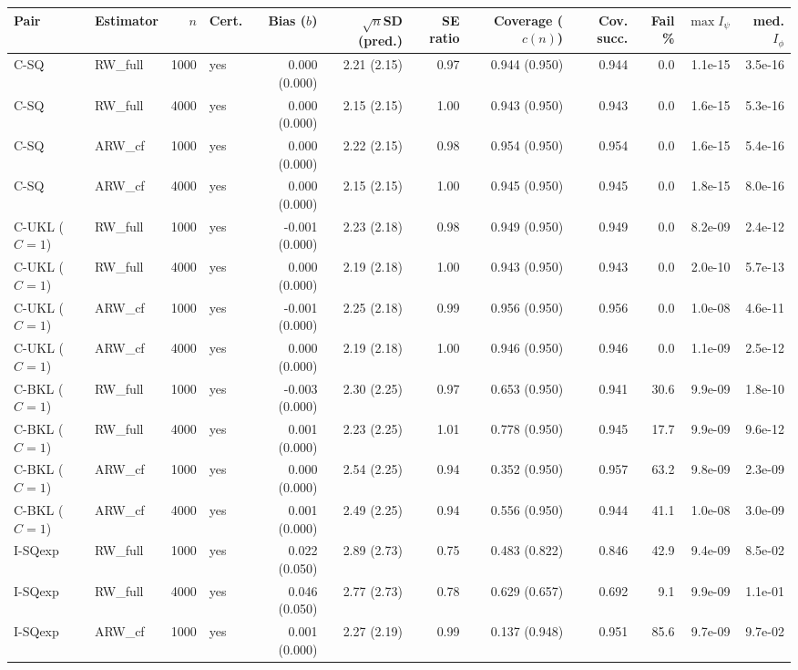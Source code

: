 \begin{tabular}{llrlrrrrrrrr}
\hline
Pair & Estimator & $n$ & Cert. & Bias ($b$) & $\sqrt{n}$SD (pred.) & SE ratio & Coverage ($c(n)$) & Cov. succ. & Fail \% & $\max I_\psi$ & med. $I_\phi$ \\
\hline
C-SQ & RW\_full & 1000 & yes & 0.000 (0.000) & 2.21 (2.15) & 0.97 & 0.944 (0.950) & 0.944 & 0.0 & 1.1e-15 & 3.5e-16 \\
C-SQ & RW\_full & 4000 & yes & 0.000 (0.000) & 2.15 (2.15) & 1.00 & 0.943 (0.950) & 0.943 & 0.0 & 1.6e-15 & 5.3e-16 \\
C-SQ & ARW\_cf & 1000 & yes & 0.000 (0.000) & 2.22 (2.15) & 0.98 & 0.954 (0.950) & 0.954 & 0.0 & 1.6e-15 & 5.4e-16 \\
C-SQ & ARW\_cf & 4000 & yes & 0.000 (0.000) & 2.15 (2.15) & 1.00 & 0.945 (0.950) & 0.945 & 0.0 & 1.8e-15 & 8.0e-16 \\
C-UKL ($C=1$) & RW\_full & 1000 & yes & -0.001 (0.000) & 2.23 (2.18) & 0.98 & 0.949 (0.950) & 0.949 & 0.0 & 8.2e-09 & 2.4e-12 \\
C-UKL ($C=1$) & RW\_full & 4000 & yes & 0.000 (0.000) & 2.19 (2.18) & 1.00 & 0.943 (0.950) & 0.943 & 0.0 & 2.0e-10 & 5.7e-13 \\
C-UKL ($C=1$) & ARW\_cf & 1000 & yes & -0.001 (0.000) & 2.25 (2.18) & 0.99 & 0.956 (0.950) & 0.956 & 0.0 & 1.0e-08 & 4.6e-11 \\
C-UKL ($C=1$) & ARW\_cf & 4000 & yes & 0.000 (0.000) & 2.19 (2.18) & 1.00 & 0.946 (0.950) & 0.946 & 0.0 & 1.1e-09 & 2.5e-12 \\
C-BKL ($C=1$) & RW\_full & 1000 & yes & -0.003 (0.000) & 2.30 (2.25) & 0.97 & 0.653 (0.950) & 0.941 & 30.6 & 9.9e-09 & 1.8e-10 \\
C-BKL ($C=1$) & RW\_full & 4000 & yes & 0.001 (0.000) & 2.23 (2.25) & 1.01 & 0.778 (0.950) & 0.945 & 17.7 & 9.9e-09 & 9.6e-12 \\
C-BKL ($C=1$) & ARW\_cf & 1000 & yes & 0.000 (0.000) & 2.54 (2.25) & 0.94 & 0.352 (0.950) & 0.957 & 63.2 & 9.8e-09 & 2.3e-09 \\
C-BKL ($C=1$) & ARW\_cf & 4000 & yes & 0.001 (0.000) & 2.49 (2.25) & 0.94 & 0.556 (0.950) & 0.944 & 41.1 & 1.0e-08 & 3.0e-09 \\
I-SQexp & RW\_full & 1000 & yes & 0.022 (0.050) & 2.89 (2.73) & 0.75 & 0.483 (0.822) & 0.846 & 42.9 & 9.4e-09 & 8.5e-02 \\
I-SQexp & RW\_full & 4000 & yes & 0.046 (0.050) & 2.77 (2.73) & 0.78 & 0.629 (0.657) & 0.692 & 9.1 & 9.9e-09 & 1.1e-01 \\
I-SQexp & ARW\_cf & 1000 & yes & 0.001 (0.000) & 2.27 (2.19) & 0.99 & 0.137 (0.948) & 0.951 & 85.6 & 9.7e-09 & 9.7e-02 \\

\end{tabular}
